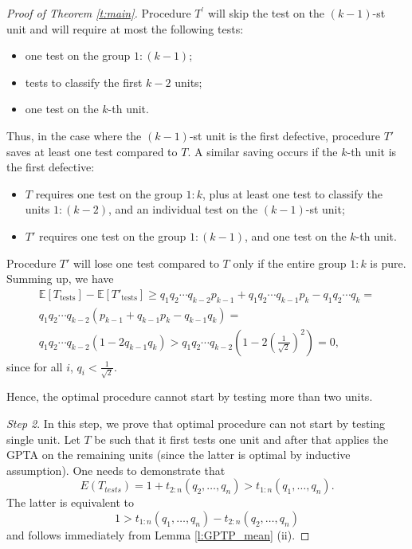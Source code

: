 \documentclass[12pt]{article}
\begin{document}
\begin{proof}[Proof of Theorem \ref{t:main}]
Procedure $T^\prime$ will skip the test on the $(k-1)$-st unit and will require at most the following tests:
\begin{itemize}
    \item one test on the group $1{:}(k-1)$;
    \item tests to classify the first $k-2$ units;
    \item one test on the $k$-th unit.
\end{itemize}
Thus, in the case where the $(k-1)$-st unit is the first defective, procedure $T'$ saves at least one test compared to $T$. A similar saving occurs if the $k$-th unit is the first defective:
\begin{itemize}
    \item $T$ requires one test on the group $1{:}k$, plus at least one test to classify the units $1{:}(k-2)$, and an individual test on the $(k-1)$-st unit;
    \item $T'$ requires one test on the group $1{:}(k-1)$, and one test on the $k$-th unit.
\end{itemize}
Procedure $T'$ will lose one test compared to $T$ only if the entire group $1{:}k$ is pure. Summing up, we have
\begin{multline*}
    \mathbb{E}[T_{\text{tests}}] - \mathbb{E}[T'_{\text{tests}}] \geq q_1 q_2 \cdots q_{k-2} p_{k-1} + q_1 q_2 \cdots q_{k-1} p_k - q_1 q_2 \cdots q_k = \\
    q_1 q_2 \cdots q_{k-2} \left( p_{k-1} + q_{k-1} p_k - q_{k-1} q_k \right) = \\
    q_1 q_2 \cdots q_{k-2} \left( 1 - 2 q_{k-1} q_k \right) > q_1 q_2 \cdots q_{k-2} \left( 1 - 2 \left( \frac{1}{\sqrt{2}} \right)^2 \right) = 0,
\end{multline*}
since for all $i$, $q_i < \frac{1}{\sqrt{2}}$.

Hence, the optimal procedure cannot start by testing more than two units.

\emph{Step 2}. In this step, we prove that optimal procedure can not start by testing single unit. Let $T$ be such that it first tests one unit and after that applies the {GPTA} on the remaining units (since the latter is optimal by inductive assumption). One needs to demonstrate that
\begin{equation*}
    E(T_{tests})=1+{t_{2:n}(q_2,\dots,q_{n})>
    t_{1:n}(q_1,\dots,q_{n})}.
\end{equation*}
The latter is equivalent to
\begin{equation*}
    1>{t_{1:n}(q_1,\dots,q_{n})-t_{2:n}(q_2,\dots,q_{n})}
\end{equation*}
and follows immediately from Lemma \ref{l:GPTP_mean} (ii).

\end{proof}
\end{document}
